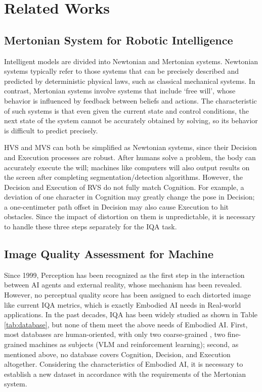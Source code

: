 \documentclass{article}
\begin{document}
\section{Related Works}
\vspace{-4pt}
\subsection{Mertonian System for Robotic Intelligence}

Intelligent models are divided into Newtonian and Mertonian \cite{review:merton} systems. Newtonian systems typically refer to those systems that can be precisely described and predicted by deterministic physical laws, such as classical mechanical systems. In contrast, Mertonian systems involve systems that include `free will', whose behavior is influenced by feedback between beliefs and actions. The characteristic of such systems is that even given the current state and control conditions, the next state of the system cannot be accurately obtained by solving, so its behavior is difficult to predict precisely.

HVS and MVS can both be simplified as Newtonian systems, since their Decision and Execution processes are robust. After humans solve a problem, the body can accurately execute the will; machines like computers will also output results on the screen after completing segmentation/detection algorithms. However, the Decision and Execution of RVS do not fully match Cognition. For example, a deviation of one character in Cognition may greatly change the pose in Decision; a one-centimeter path offset in Decision may also cause Execution to hit obstacles. Since the impact of distortion on them is unpredictable, it is necessary to handle these three steps separately for the IQA task.

\subsection{Image Quality Assessment for Machine}

Since 1999, Perception has been recognized as the first step in the interaction between AI agents and external reality, whose mechanism \cite{review:perception1,review:perception2,review:perception3,review:perception4} has been revealed. However, no perceptual quality score has been assigned to each distorted image like current IQA \cite{dataset:cmc,my:rbench,add:aigc} metrics, which is exactly Embodied AI needs in Real-world applications. In the past decades, IQA has been widely studied as shown in Table \ref{tab:database}, but none of them meet the above needs of Embodied AI. First, most databases are human-oriented, with only two coarse-grained \cite{add:smr1,add:smr2}, two fine-grained \cite{dataset:mpd,dataset:epd} machines as subjects (VLM and reinforcement learning); second, as mentioned above, no database covers Cognition, Decision, and Execution altogether. Considering the characteristics of Embodied AI, it is necessary to establish a new dataset in accordance with the requirements of the Mertonian system.
\end{document}

